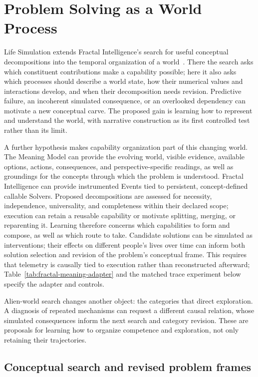 \documentclass[10pt]{article}
\begin{document}
\section{Problem Solving as a World Process}
\label{sec:problem-solving-events}

Life Simulation extends Fractal Intelligence's search for useful conceptual decompositions
into the temporal organization of a world~\cite{westerbergFractal2026}.
There the search asks which constituent contributions make a capability
possible; here it also asks which processes should describe a world state,
how their numerical values and interactions develop, and when their
decomposition needs revision. Predictive failure, an incoherent simulated
consequence, or an overlooked dependency can motivate a new conceptual carve.
The proposed gain is learning how to represent and understand the world,
with narrative construction as its first controlled test rather than its limit.

A further hypothesis makes capability organization part of this changing
world. The Meaning Model can provide the evolving world, visible evidence,
available options, actions, consequences, and perspective-specific readings,
as well as groundings for the concepts through which the problem is understood.
Fractal Intelligence can provide instrumented Events tied to persistent,
concept-defined callable Solvers. Proposed decompositions are assessed for
necessity, independence, universality, and completeness within their declared
scope; execution can retain
a reusable capability or motivate splitting, merging, or reparenting it.
Learning therefore concerns which capabilities to form and compose, as well
as which route to take. Candidate solutions can be simulated as interventions;
their effects on different people's lives over time can inform both solution
selection and revision of the problem's conceptual frame. This requires that telemetry is causally tied to
execution rather than reconstructed afterward; Table~\ref{tab:fractal-meaning-adapter}
and the matched trace experiment below specify the adapter and controls.

Alien-world search changes another object:
the categories that direct exploration. A diagnosis of repeated mechanisms can
request a different causal relation, whose simulated consequences inform the
next search and category revision. These are proposals for learning how to
organize competence and exploration, not only retaining their trajectories.

\subsection{Conceptual search and revised problem frames}
\label{sec:conceptual-search}
\end{document}
